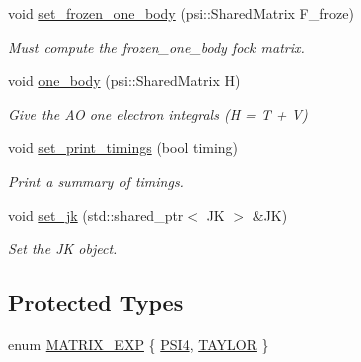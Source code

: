 \begin{DoxyCompactItemize}
void \mbox{\hyperlink{classforte_1_1_orbital_optimizer_a8473b0a13d06e6757eb98b08d0e5ea07}{set\+\_\+frozen\+\_\+one\+\_\+body}} (psi\+::\+Shared\+Matrix F\+\_\+froze)
\begin{DoxyCompactList}\small\item\em Must compute the frozen\+\_\+one\+\_\+body fock matrix. \end{DoxyCompactList}\item 
void \mbox{\hyperlink{classforte_1_1_orbital_optimizer_a5ca11117fb746c532f964edca9e11483}{one\+\_\+body}} (psi\+::\+Shared\+Matrix H)
\begin{DoxyCompactList}\small\item\em Give the AO one electron integrals (H = T + V) \end{DoxyCompactList}\item 
void \mbox{\hyperlink{classforte_1_1_orbital_optimizer_a5c8716e0bae31ce5ed43464b612a4648}{set\+\_\+print\+\_\+timings}} (bool timing)
\begin{DoxyCompactList}\small\item\em Print a summary of timings. \end{DoxyCompactList}\item 
void \mbox{\hyperlink{classforte_1_1_orbital_optimizer_adfde10cea1c788ab2f3647906447ccfd}{set\+\_\+jk}} (std\+::shared\+\_\+ptr$<$ JK $>$ \&JK)
\begin{DoxyCompactList}\small\item\em Set the JK object. \end{DoxyCompactList}\end{DoxyCompactItemize}
\subsection*{Protected Types}
\begin{DoxyCompactItemize}
\item 
enum \mbox{\hyperlink{classforte_1_1_orbital_optimizer_a980c6c26da8235026de349b1b11ccc02}{M\+A\+T\+R\+I\+X\+\_\+\+E\+XP}} \{ \mbox{\hyperlink{classforte_1_1_orbital_optimizer_a980c6c26da8235026de349b1b11ccc02aaa88911fe72bdb92ecc6faec6415431c}{P\+S\+I4}}, 
\mbox{\hyperlink{classforte_1_1_orbital_optimizer_a980c6c26da8235026de349b1b11ccc02a27d6b1d722fcd3260c4ef85ba48e75e6}{T\+A\+Y\+L\+OR}}
 \}
\end{DoxyCompactItemize}
